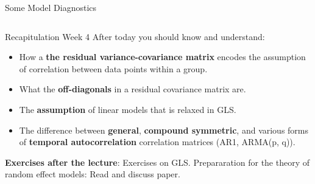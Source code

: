 \documentclass{beamer}
\newenvironment{VerbatimIN}
 {\VerbatimEnvironment
  \begin{tcolorbox}[
    breakable,
    colback=lightgray,
    spartan
  ]%
  \begin{Verbatim}}
 {\end{Verbatim}\end{tcolorbox}}
\begin{document}
\begin{frame}[fragile]{Some Model Diagnostics}
\begin{columns}
    \end{columns}
\end{frame}

\begin{frame}{Recapitulation Week 4}
  After today you should know and understand:
  \begin{itemize}
    \item How a \textbf{the residual variance-covariance matrix} encodes the assumption of correlation between data points within a group.
    \item What the \textbf{off-diagonals} in a residual covariance matrix are.
    \item The \textbf{assumption} of linear models that is relaxed in GLS.
    \item The difference between \textbf{general}, \textbf{compound symmetric}, and various forms of \textbf{temporal autocorrelation} correlation matrices (AR1, ARMA(p, q)).
  \end{itemize}
  \textbf{Exercises after the lecture}: Exercises on GLS. Prepararation for the theory of random effect models: Read and discuss paper.
\end{frame}
\end{document}
